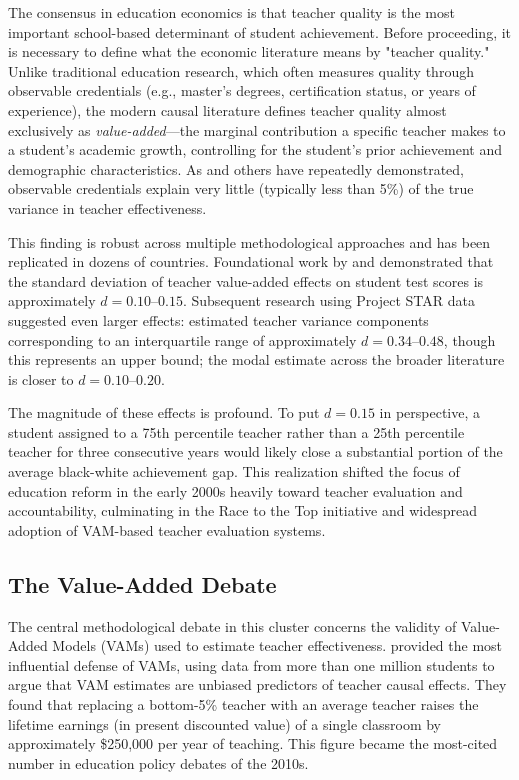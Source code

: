 \documentclass[12pt,letterpaper]{article}
\begin{document}
The consensus in education economics is that teacher quality is the most important school-based determinant of student achievement. Before proceeding, it is necessary to define what the economic literature means by "teacher quality." Unlike traditional education research, which often measures quality through observable credentials (e.g., master's degrees, certification status, or years of experience), the modern causal literature defines teacher quality almost exclusively as \textit{value-added}---the marginal contribution a specific teacher makes to a student's academic growth, controlling for the student's prior achievement and demographic characteristics. As \citet{rivkin2005} and others have repeatedly demonstrated, observable credentials explain very little (typically less than 5\%) of the true variance in teacher effectiveness.

This finding is robust across multiple methodological approaches and has been replicated in dozens of countries. Foundational work by \citet{rivkin2005} and \citet{rockoff2004} demonstrated that the standard deviation of teacher value-added effects on student test scores is approximately $d = 0.10$--$0.15$. Subsequent research using Project STAR data suggested even larger effects: \citet{nye2004} estimated teacher variance components corresponding to an interquartile range of approximately $d = 0.34$--$0.48$, though this represents an upper bound; the modal estimate across the broader literature is closer to $d = 0.10$--$0.20$.

The magnitude of these effects is profound. To put $d = 0.15$ in perspective, a student assigned to a 75th percentile teacher rather than a 25th percentile teacher for three consecutive years would likely close a substantial portion of the average black-white achievement gap. This realization shifted the focus of education reform in the early 2000s heavily toward teacher evaluation and accountability, culminating in the Race to the Top initiative and widespread adoption of VAM-based teacher evaluation systems.

\subsection{The Value-Added Debate}

The central methodological debate in this cluster concerns the validity of Value-Added Models (VAMs) used to estimate teacher effectiveness. \citet{chetty2014a, chetty2014b} provided the most influential defense of VAMs, using data from more than one million students to argue that VAM estimates are unbiased predictors of teacher causal effects. They found that replacing a bottom-5\% teacher with an average teacher raises the lifetime earnings (in present discounted value) of a single classroom by approximately \$250,000 per year of teaching. This figure became the most-cited number in education policy debates of the 2010s.
\end{document}
